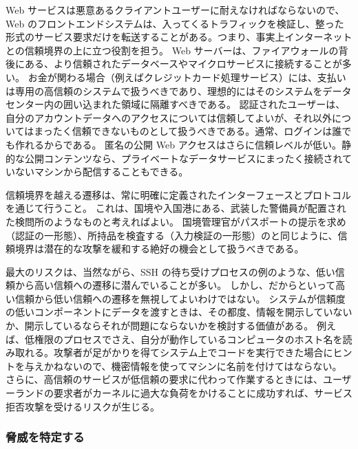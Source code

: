 \documentclass[uplatex]{jsarticle}
\def\label#1{}%
\begin{document}
\begin{exa}\label{exa:ch2-web-trust-levels}
Web サービスは悪意あるクライアントユーザーに耐えなければならないので、Web のフロントエンドシステムは、入ってくるトラフィックを検証し、整った形式のサービス要求だけを転送することがある。つまり、事実上インターネットとの信頼境界の上に立つ役割を担う。
Web サーバーは、ファイアウォールの背後にある、より信頼されたデータベースやマイクロサービスに接続することが多い。
お金が関わる場合（例えばクレジットカード処理サービス）には、支払いは専用の高信頼のシステムで扱うべきであり、理想的にはそのシステムをデータセンター内の囲い込まれた領域に隔離すべきである。
認証されたユーザーは、自分のアカウントデータへのアクセスについては信頼してよいが、それ以外についてはまったく信頼できないものとして扱うべきである。通常、ログインは誰でも作れるからである。
匿名の公開 Web アクセスはさらに信頼レベルが低い。静的な公開コンテンツなら、プライベートなデータサービスにまったく接続されていないマシンから配信することもできる。
\end{exa}

信頼境界を越える遷移は、常に明確に定義されたインターフェースとプロトコルを通じて行うこと。
これは、国境や入国港にある、武装した警備員が配置された検問所のようなものと考えればよい。
国境管理官がパスポートの提示を求め（認証の一形態）、所持品を検査する（入力検証の一形態）のと同じように、信頼境界は潜在的な攻撃を緩和する絶好の機会として扱うべきである。

最大のリスクは、当然ながら、SSH の待ち受けプロセスの例のような、低い信頼から高い信頼への遷移に潜んでいることが多い。
しかし、だからといって高い信頼から低い信頼への遷移を無視してよいわけではない。
システムが信頼度の低いコンポーネントにデータを渡すときは、その都度、情報を開示していないか、開示しているならそれが問題にならないかを検討する価値がある。
例えば、低権限のプロセスでさえ、自分が動作しているコンピュータのホスト名を読み取れる。攻撃者が足がかりを得てシステム上でコードを実行できた場合にヒントを与えかねないので、機密情報を使ってマシンに名前を付けてはならない。
さらに、高信頼のサービスが低信頼の要求に代わって作業するときには、ユーザーランドの要求者がカーネルに過大な負荷をかけることに成功すれば、サービス拒否攻撃を受けるリスクが生じる。

\subsubsection{脅威を特定する}\label{subsec:ch2-identify-threats}
\end{document}
